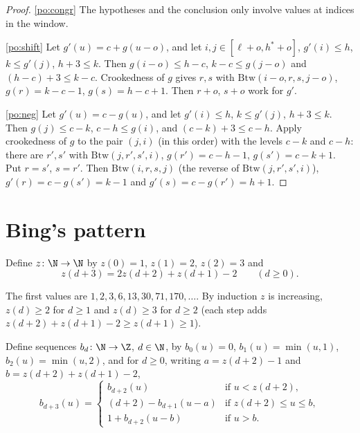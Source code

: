 \begin{proof}
\ref{po:congr} The hypotheses and the conclusion only involve values at indices in the window.

\ref{po:shift} Let $g'(u)=c+g(u-o)$, and let $i,j\in[\ell+o,h^*+o]$, $g'(i)\le h$, $k\le g'(j)$,
$h+3\le k$. Then $g(i-o)\le h-c$, $k-c\le g(j-o)$ and $(h-c)+3\le k-c$. Crookedness of $g$ gives
$r,s$ with $\mathrm{Btw}(i-o,r,s,j-o)$, $g(r)=k-c-1$, $g(s)=h-c+1$. Then $r+o$, $s+o$ work for
$g'$.

\ref{po:neg} Let $g'(u)=c-g(u)$, and let $g'(i)\le h$, $k\le g'(j)$, $h+3\le k$. Then $g(j)\le
c-k$, $c-h\le g(i)$, and $(c-k)+3\le c-h$. Apply crookedness of $g$ to the pair $(j,i)$ (in this
order) with the levels $c-k$ and $c-h$: there are $r',s'$ with $\mathrm{Btw}(j,r',s',i)$,
$g(r')=c-h-1$, $g(s')=c-k+1$. Put $r=s'$, $s=r'$. Then $\mathrm{Btw}(i,r,s,j)$ (the reverse of
$\mathrm{Btw}(j,r',s',i)$), $g'(r)=c-g(s')=k-1$ and $g'(s)=c-g(r')=h+1$.
\end{proof}


\section{Bing's pattern}

\begin{definition}\label{def:z}
Define $z\colon\N\to\N$ by $z(0)=1$, $z(1)=2$, $z(2)=3$ and
\[
z(d+3)=2z(d+2)+z(d+1)-2\qquad(d\ge0).
\]
\end{definition}

The first values are $1,2,3,6,13,30,71,170,\dots$. By induction $z$ is increasing, $z(d)\ge2$ for
$d\ge1$ and $z(d)\ge3$ for $d\ge2$ (each step adds $z(d+2)+z(d+1)-2\ge z(d+1)\ge1$).


\begin{definition}\label{def:bingF}
Define sequences $b_d\colon\N\to\Z$, $d\in\N$, by $b_0(u)=0$, $b_1(u)=\min(u,1)$,
$b_2(u)=\min(u,2)$, and for $d\ge0$, writing $a=z(d+2)-1$ and $b=z(d+2)+z(d+1)-2$,
\[
b_{d+3}(u)=\begin{cases}
b_{d+2}(u) & \text{if } u<z(d+2),\\[2pt]
(d+2)-b_{d+1}(u-a) & \text{if } z(d+2)\le u\le b,\\[2pt]
1+b_{d+2}(u-b) & \text{if } u>b.
\end{cases}
\]
\end{definition}

